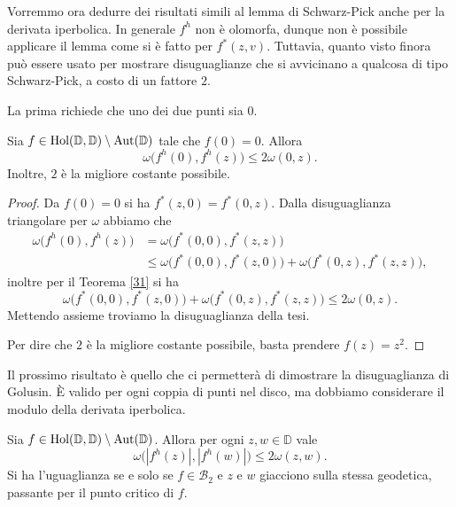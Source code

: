 Vorremmo ora dedurre dei risultati simili al lemma di Schwarz-Pick anche per la derivata iperbolica. In generale $f^h$ non è olomorfa, dunque non è possibile applicare il lemma come si è fatto per $f^*(z,v)$. Tuttavia, quanto visto finora può essere usato per mostrare disuguaglianze che si avvicinano a qualcosa di tipo Schwarz-Pick, a costo di un fattore $2$.

La prima richiede che uno dei due punti sia $0$.

\begin{cor} \label{36}
  Sia $f \in \text{\normalfont{Hol}}(\mathbb{D},\mathbb{D})\setminus\text{\normalfont{Aut}}(\mathbb{D})$ tale che $f(0)=0$. Allora
  \begin{equation}
    \omega\bigl(f^h(0),f^h(z)\bigr) \le 2\omega(0,z).
  \end{equation}
  Inoltre, $2$ è la migliore costante possibile.
\end{cor}

\begin{proof}
  Da $f(0)=0$ si ha $f^*(z,0)=f^*(0,z)$. Dalla disuguaglianza triangolare per $\omega$ abbiamo che
  \begin{align*}
    \omega\bigl(f^h(0),f^h(z)\bigr) & = \omega\bigl(f^*(0,0),f^*(z,z)\bigr) \\
    & \le \omega\bigl(f^*(0,0),f^*(z,0)\bigr)+\omega\bigl(f^*(0,z),f^*(z,z)\bigr),
  \end{align*}
  inoltre per il Teorema \ref{31} si ha
  $$\omega\bigl(f^*(0,0),f^*(z,0)\bigr)+\omega\bigl(f^*(0,z),f^*(z,z)\bigr)\le 2\omega(0,z).$$
  Mettendo assieme troviamo la disuguaglianza della tesi.

  Per dire che $2$ è la migliore costante possibile, basta prendere $f(z)=z^2$.
\end{proof}

Il prossimo risultato è quello che ci permetterà di dimostrare la disuguaglianza di Golusin. È valido per ogni coppia di punti nel disco, ma dobbiamo considerare il modulo della derivata iperbolica.

\begin{cor} \label{quasigolusin}
  Sia $f \in \text{\normalfont{Hol}}(\mathbb{D},\mathbb{D})\setminus\text{\normalfont{Aut}}(\mathbb{D})$. Allora per ogni $z, w \in \mathbb{D}$ vale
  \begin{equation} \label{quasigol}
    \omega\bigl(|f^h(z)|, |f^h(w)|\bigr) \le 2\omega(z,w).
  \end{equation}
  Si ha l'uguaglianza se e solo se $f \in \mathcal{B}_2$ e $z$ e $w$ giacciono sulla stessa geodetica, passante per il punto critico di $f$.
\end{cor}

